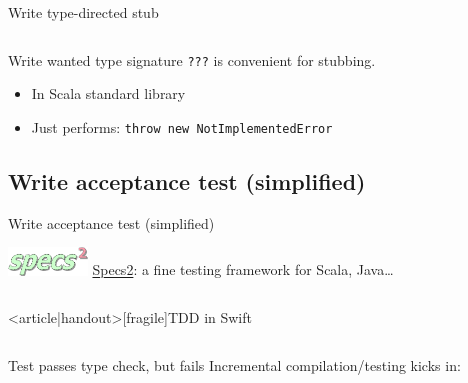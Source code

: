 \begin{frame}[fragile]{Write type-directed stub}
  \inputminted{scala}{Main2.scala}

  \begin{block}{Write wanted type signature}
    \texttt{???} is convenient for stubbing.
    \begin{itemize}
    \item In Scala standard library
    \item Just performs: \texttt{throw new NotImplementedError}
    \end{itemize}
  \end{block}
\end{frame}

\subsection{Write acceptance test (simplified)}

\begin{frame}[fragile]{Write acceptance test (simplified)}
  \begin{block}{\includegraphics[height=0.75cm]{specs2.png}}
    \href{http://specs2.org/}{Specs2}: a fine testing framework for Scala, Java\dots
  \end{block}

  \inputminted{scala}{MainSpec1.scala}

\end{frame}

\begin{frame}<article|handout>[fragile]{TDD in Swift}
  \inputminted{ocaml}{MainSpec1.swift}
\end{frame}

\begin{frame}[fragile]{Test passes type check, but fails}
  Incremental compilation/testing kicks in:

  \inputminted{console}{testQuick2.console}
\end{frame}

